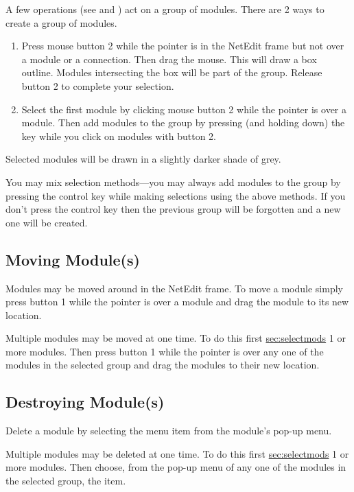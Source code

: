A few operations (see  and
) act on a group of
modules.  There are 2 ways to create a group of modules.

\begin{enumerate}
\item Press mouse button 2 while the pointer is in the NetEdit frame but not over
a module or a connection.  Then drag the mouse.  This will draw a box
outline.  Modules intersecting the box will be part of the group.  Release
button 2 to complete your selection.
\item Select the first module by clicking mouse button 2 while the pointer is
over a module.  Then add modules to the group by pressing (and holding
down) the  key while you click on modules with button 2.
\end{enumerate}

Selected modules will be drawn in a slightly darker shade of grey.

You may mix selection methods---you may always add modules to the group by
pressing the control key while making selections using the above methods.
If you don't press the control key then the previous group will be
forgotten and a new one will be created.

\subsection{Moving Module(s)}
\label{sec:movemod}

Modules may be moved around in the NetEdit frame.  To move a module simply
press button 1 while the pointer is over a module and drag the module to
its new location.

Multiple modules may be moved at one time.  To do this first
\hyperref{select}{select (see Section~}{)}{sec:selectmods} 1 or more
modules. Then press button 1 while the pointer is over any one of the
modules in the selected group and drag the modules to their new location.


\subsection{Destroying Module(s)}
\label{sec:destroymod}

Delete a module by selecting the  menu item from the
module's pop-up menu.

Multiple modules may be deleted at one time.  To do this first
\hyperref{select}{select (see Section~}{)}{sec:selectmods} 1 or more
modules. Then choose, from the pop-up menu of any one of the modules in the
selected group, the  item.


